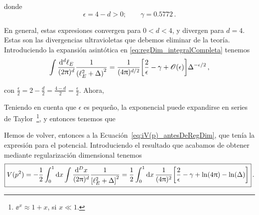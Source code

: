 \noindent donde 
%
\begin{equation}
	\epsilon = 4 - d > 0; \qquad \gamma = 0.5772 \,.
\end{equation}

En general, estas expresiones convergen para $0 < d < 4$, y divergen para $d =4$. Estas son las divergencias ultravioletas que debemos eliminar de la teoría. Introduciendo la expansión asintótica en \eqref{eq:regDim_integralCompleta} tenemos
%
\begin{equation}
	\int \frac{\dd[d]\ell_E}{(2\uppi)^d} \frac{1}{\qty(\ell_E^2 + \Delta)^2} = \frac{1}{(4\uppi)^{d/2}} \qty[\frac{2}{\epsilon} - \gamma + \mathscr{O}(\epsilon)] \Delta^{-\epsilon/2} \,,
\end{equation}

\noindent con  $\frac{\epsilon}{2} = 2 - \frac{d}{2} = \frac{4-d}{2} = \frac{\epsilon}{2}$. Ahora, 
%

Teniendo en cuenta que $\epsilon$ es pequeño, la exponencial puede expandirse en series de Taylor~\footnote{$\ee^{x} \approx 1 + x$, \quad si $x \ll 1$.}, y entonces tenemos que 
%


Hemos de volver, entonces a la Ecuación~\eqref{eq:iV(p)_antesDeRegDim}, que tenía la expresión para el potencial. Introduciendo el resultado que acabamos de obtener mediante regularización dimensional tenemos
%
\begin{equation}
	\boxed{
	V(p^2) = -\frac{1}{2} \int_0^1 \dd{x} \int \frac{\dd[D]{x}}{(2\uppi)^d} \frac{1}{\qty[\ell_E^2 + \Delta]^2} = \frac{1}{2} \int_0^1 \dd{x} \frac{1}{(4\uppi)^2} \qty[\frac{2}{\epsilon} - \gamma + \ln(4\uppi) - \ln(\Delta)]
} \,.
\end{equation}

